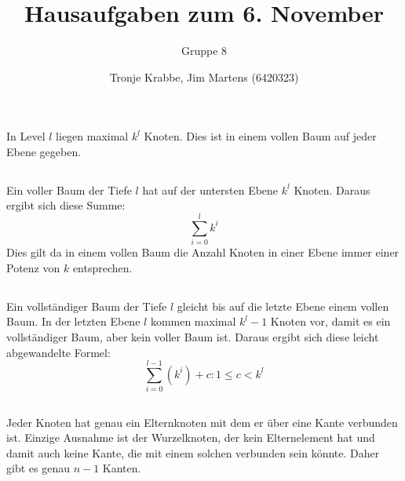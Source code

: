 \documentclass[10pt,a4paper,oneside,ngerman,numbers=noenddot]{scrartcl}
\begin{document}
\author{Tronje Krabbe, Jim Martens (6420323)}
\title{Hausaufgaben zum 6. November}
\subtitle{Gruppe 8}
\maketitle
\section{} %
	\subsection{} %
		In Level $l$ liegen maximal $k^{l}$ Knoten. Dies ist in einem vollen Baum auf jeder Ebene gegeben.
	\subsection{} %
		Ein voller Baum der Tiefe $l$ hat auf der untersten Ebene $k^{l}$ Knoten. Daraus ergibt sich diese Summe:
		\[
			\sum\limits_{i=0}^{l} k^{i}
		\]
		Dies gilt da in einem vollen Baum die Anzahl Knoten in einer Ebene immer einer Potenz von $k$ entsprechen.
	\subsection{} %
		Ein vollständiger Baum der Tiefe $l$ gleicht bis auf die letzte Ebene einem vollen Baum. In der letzten Ebene $l$ kommen maximal $k^{l} - 1$ Knoten vor, damit es ein vollständiger Baum, aber kein voller Baum ist. Daraus ergibt sich diese leicht abgewandelte Formel:
		\[
			\sum\limits_{i=0}^{l-1} \left(k^{i}\right) + c : 1 \leq c < k^{l}
		\]
	\subsection{} %
		Jeder Knoten hat genau ein Elternknoten mit dem er über eine Kante verbunden ist. Einzige Ausnahme ist der Wurzelknoten, der kein Elternelement hat und damit auch keine Kante, die mit einem solchen verbunden sein könnte. Daher gibt es genau $n-1$ Kanten.
\section{} %
	\subsection{} %
	\subsection{} %
\end{document}
